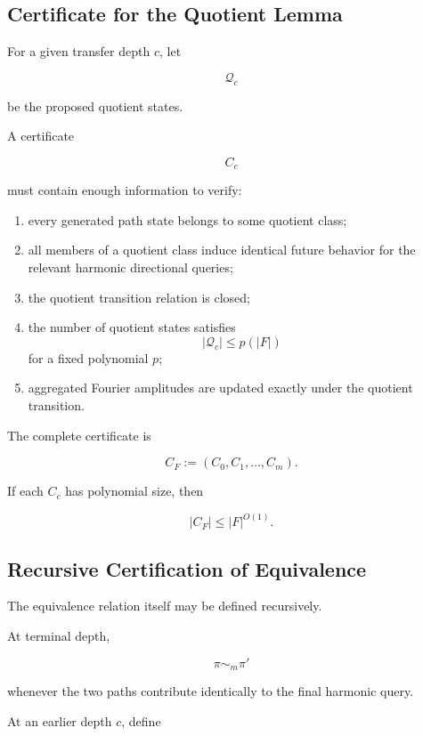 \documentclass[11pt]{article}
\theoremstyle{plain}
\theoremstyle{definition}
\begin{document}
\subsection{Certificate for the Quotient Lemma}

For a given transfer depth \(c\), let

\[
    \mathcal{Q}_c
\]

be the proposed quotient states.

A certificate

\[
    C_c
\]

must contain enough information to verify:

\begin{enumerate}
    \item every generated path state belongs to some quotient class;

    \item all members of a quotient class induce identical future behavior
    for the relevant harmonic directional queries;

    \item the quotient transition relation is closed;

    \item the number of quotient states satisfies
    \[
        |\mathcal{Q}_c|
        \leq p(|F|)
    \]
    for a fixed polynomial \(p\);

    \item aggregated Fourier amplitudes are updated exactly under the quotient
    transition.
\end{enumerate}

The complete certificate is

\[
    C_F
    :=
    (C_0,C_1,\dots,C_m).
\]

If each \(C_c\) has polynomial size, then

\[
    |C_F|
    \leq
    |F|^{O(1)}.
\]

\subsection{Recursive Certification of Equivalence}

The equivalence relation itself may be defined recursively.

At terminal depth,

\[
    \pi\sim_m\pi'
\]

whenever the two paths contribute identically to the final harmonic query.

At an earlier depth \(c\), define
\end{document}
